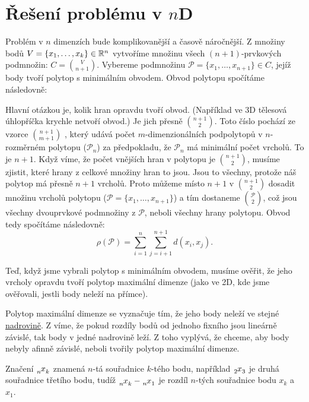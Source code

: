 \section{Řešení problému v \texorpdfstring{$n$D}{nD}}
\label{sec:reseni_1D}

Problém v $n$ dimenzích bude komplikovanější a časově náročnější. Z množiny bodů $V = \{x_1,\ldots, x_k\} \in \mathbb{R}^n$ vytvoříme množinu všech $(n+1)$-prvkových podmnožin: $C = \binom{V}{n+1}$. Vybereme podmnožinu $\mathcal{P} = \{x_1, \dots, x_{n+1}\} \in C$, jejíž body tvoří polytop s minimálním obvodem. Obvod polytopu spočítáme následovně:

Hlavní otázkou je, kolik hran opravdu tvoří obvod. (Například ve $3$D tělesová úhlopříčka krychle netvoří obvod.) Je jich přesně $\binom{n+1}{2}$. Toto číslo pochází ze vzorce $\binom{n+1}{m+1}$ \autocite[120]{coxeter1973regular},
který udává počet $m$-dimenzionál\-ních podpolytopů v $n$-rozměrném polytopu ($\mathcal{P}_n$) za předpokladu, že $\mathcal{P}_n$ má minimální počet vrcholů. To je $n+1$. 
Když víme, že počet vnějších hran v polytopu je $\binom{n+1}{2}$, musíme zjistit, které hrany z celkové množiny hran to jsou. Jsou to všechny, protože náš polytop má přesně $n+1$ vrcholů. Proto můžeme místo $n+1$ v $\binom{n+1}{2}$ dosadit množinu vrcholů polytopu ($\mathcal{P} = \{x_1, \dots, x_{n+1}\}$) a tím dostaneme $\binom{\mathcal{P}}{2}$, což jsou všechny dvouprvkové podmnožiny z $\mathcal{P}$, neboli všechny hrany polytopu. Obvod tedy spočítáme následovně:
\begin{equation*}
  \rho(\mathcal{P}) = \sum_{i=1}^{n} \sum_{j=i+1}^{n+1}d(x_i, x_{j}).
\end{equation*}

Teď, když jsme vybrali polytop s minimálním obvodem, musíme ověřit, že jeho vrcholy opravdu tvoří polytop maximální dimenze (jako ve 2D, kde jsme ověřovali, jestli body neleží na přímce).

Polytop maximální dimenze se vyznačuje tím, že jeho body neleží ve stejné \hyperref[definice:nadrovina]{nadrovině}. Z  víme, že pokud rozdíly bodů od jednoho fixního jsou lineárně závislé, tak body v jedné nadrovině leží. Z toho vyplývá, že chceme, aby body nebyly afinně závislé, neboli tvořily polytop maximální dimenze.  

\begin{poznamka} 
  \label{poznamka:varovani_index}
  Značení $\x{n}{k}$ znamená $n$-tá souřadnice $k$-tého bodu, například $\x{2}{3}$ je dru\-há souřadnice třetího bodu, tudíž $\x{n}{k} - \x{n}{1}$ je rozdíl $n$-tých souřadnice bodu $x_k$ a $x_1$. 
\end{poznamka}

